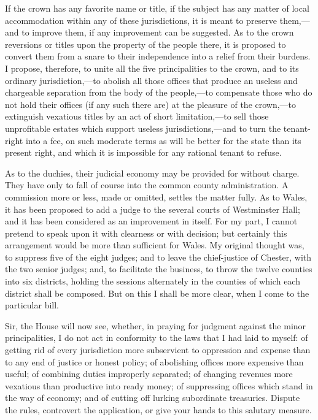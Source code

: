 If the crown has any favorite name or title, if the subject has any matter of local accommodation within any of these jurisdictions, it is meant to preserve them,—and to improve them, if any improvement can be suggested. As to the crown reversions or titles upon the property of the people there, it is proposed to convert them from a snare to their independence into a relief from their burdens. I propose, therefore, to unite all the five principalities to the crown, and to its ordinary jurisdiction,—to abolish all those offices that produce an useless and chargeable separation from the body of the people,—to compensate those who do not hold their offices (if any such there are) at the pleasure of the crown,—to extinguish vexatious titles by an act of short limitation,—to sell those unprofitable estates which support useless jurisdictions,—and to turn the tenant-right into a fee, on such moderate terms as will be better for the state than its present right, and which it is impossible for any rational tenant to refuse.

As to the duchies, their judicial economy may be provided for without charge. They have only to fall of course into the common county administration. A commission more or less, made or omitted, settles the matter fully. As to Wales, it has been proposed to add a judge to the several courts of Westminster Hall; and it has been considered as an improvement in itself. For my part, I cannot pretend to speak upon it with clearness or with decision; but certainly this arrangement would be more than sufficient for Wales. My original thought was, to suppress five of the eight judges; and to leave the chief-justice of Chester, with the two senior judges; and, to facilitate the business, to throw the twelve counties into six districts, holding the sessions alternately in the counties of which each district shall be composed. But on this I shall be more clear, when I come to the particular bill.

Sir, the House will now see, whether, in praying for judgment against the minor principalities, I do not act in conformity to the laws that I had laid to myself: of getting rid of every jurisdiction more subservient to oppression and expense than to any end of justice or honest policy; of abolishing offices more expensive than useful; of combining duties improperly separated; of changing revenues more vexatious than productive into ready money; of suppressing offices which stand in the way of economy; and of cutting off lurking subordinate treasuries. Dispute the rules, controvert the application, or give your hands to this salutary measure.

